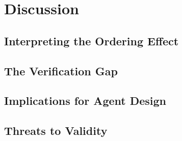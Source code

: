 \section{Discussion}
\label{sec:discussion}

\subsection{Interpreting the Ordering Effect}
\label{sec:disc-ordering}

\subsection{The Verification Gap}
\label{sec:disc-verification}

\subsection{Implications for Agent Design}
\label{sec:disc-design}

\subsection{Threats to Validity}
\label{sec:disc-threats}
